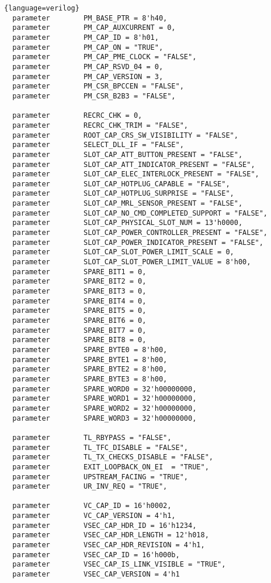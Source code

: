 \begin{lstlisting}{language=verilog}
  parameter        PM_BASE_PTR = 8'h40,
  parameter        PM_CAP_AUXCURRENT = 0,
  parameter        PM_CAP_ID = 8'h01,
  parameter        PM_CAP_ON = "TRUE",
  parameter        PM_CAP_PME_CLOCK = "FALSE",
  parameter        PM_CAP_RSVD_04 = 0,
  parameter        PM_CAP_VERSION = 3,
  parameter        PM_CSR_BPCCEN = "FALSE",
  parameter        PM_CSR_B2B3 = "FALSE",

  parameter        RECRC_CHK = 0,
  parameter        RECRC_CHK_TRIM = "FALSE",
  parameter        ROOT_CAP_CRS_SW_VISIBILITY = "FALSE",
  parameter        SELECT_DLL_IF = "FALSE",
  parameter        SLOT_CAP_ATT_BUTTON_PRESENT = "FALSE",
  parameter        SLOT_CAP_ATT_INDICATOR_PRESENT = "FALSE",
  parameter        SLOT_CAP_ELEC_INTERLOCK_PRESENT = "FALSE",
  parameter        SLOT_CAP_HOTPLUG_CAPABLE = "FALSE",
  parameter        SLOT_CAP_HOTPLUG_SURPRISE = "FALSE",
  parameter        SLOT_CAP_MRL_SENSOR_PRESENT = "FALSE",
  parameter        SLOT_CAP_NO_CMD_COMPLETED_SUPPORT = "FALSE",
  parameter        SLOT_CAP_PHYSICAL_SLOT_NUM = 13'h0000,
  parameter        SLOT_CAP_POWER_CONTROLLER_PRESENT = "FALSE",
  parameter        SLOT_CAP_POWER_INDICATOR_PRESENT = "FALSE",
  parameter        SLOT_CAP_SLOT_POWER_LIMIT_SCALE = 0,
  parameter        SLOT_CAP_SLOT_POWER_LIMIT_VALUE = 8'h00,
  parameter        SPARE_BIT1 = 0,
  parameter        SPARE_BIT2 = 0,
  parameter        SPARE_BIT3 = 0,
  parameter        SPARE_BIT4 = 0,
  parameter        SPARE_BIT5 = 0,
  parameter        SPARE_BIT6 = 0,
  parameter        SPARE_BIT7 = 0,
  parameter        SPARE_BIT8 = 0,
  parameter        SPARE_BYTE0 = 8'h00,
  parameter        SPARE_BYTE1 = 8'h00,
  parameter        SPARE_BYTE2 = 8'h00,
  parameter        SPARE_BYTE3 = 8'h00,
  parameter        SPARE_WORD0 = 32'h00000000,
  parameter        SPARE_WORD1 = 32'h00000000,
  parameter        SPARE_WORD2 = 32'h00000000,
  parameter        SPARE_WORD3 = 32'h00000000,

  parameter        TL_RBYPASS = "FALSE",
  parameter        TL_TFC_DISABLE = "FALSE",
  parameter        TL_TX_CHECKS_DISABLE = "FALSE",
  parameter        EXIT_LOOPBACK_ON_EI  = "TRUE",
  parameter        UPSTREAM_FACING = "TRUE",
  parameter        UR_INV_REQ = "TRUE",

  parameter        VC_CAP_ID = 16'h0002,
  parameter        VC_CAP_VERSION = 4'h1,
  parameter        VSEC_CAP_HDR_ID = 16'h1234,
  parameter        VSEC_CAP_HDR_LENGTH = 12'h018,
  parameter        VSEC_CAP_HDR_REVISION = 4'h1,
  parameter        VSEC_CAP_ID = 16'h000b,
  parameter        VSEC_CAP_IS_LINK_VISIBLE = "TRUE",
  parameter        VSEC_CAP_VERSION = 4'h1

\end{lstlisting}

